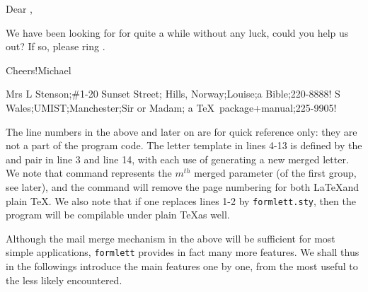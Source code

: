 {\edef\setrawcount{\stt\noexpand
  }

\relax
\setrawcount
  
  \beginletter
    \NOPAGENUMBERS\parindent=0pt
    \paras[1]\par\paras[2]\par
    \paras[3]\par\medskip
    Dear \paras[4], \par\medskip
    We have been looking for
    \paras[5] for quite a while
    without any luck, could you help
    us out? If so, please ring
    \paras[6]. \par\medskip
    Cheers!\hfill Michael\vfill\eject
  \endletter

  \moreletter %
    Mrs L Stenson;\#1-20 Sunset Street;%
    Hills, Norway;Louise;a Bible;220-8888!
  \moreletter %
    S Wales;UMIST;Manchester;Sir or Madam;%
    a \TeX\ package{+}manual;225-9905!
  
\unsetraw
\rm

The line numbers in the above and later on are for quick reference only:
they are not a part of the program code. The letter template in lines
4-13 is defined by the {\tt\string\beginletter} and {\tt\string\endletter}
pair in line 3 and line 14, with each use of {\tt\string\moreletter}
generating a new merged letter. We note that command {\tt \string\paras[{\it
m}]} represents the $m^{th}$ merged parameter (of the first group, see
later), and the command {\tt\string\NOPAGENUMBERS}
will remove the page numbering for both \LaTeX\space and plain
\TeX. We also note that if one replaces lines 1-2 by
{\tt\string\space formlett.sty}, then the program will be
compilable under plain \TeX\space as well.


\medskip

Although the mail merge mechanism in the above will be sufficient for
most simple applications, {\tt formlett} provides in fact many more
features. We shall thus in the followings introduce the main features
one by one, from the most useful to the less likely encountered.

\medskip

}
